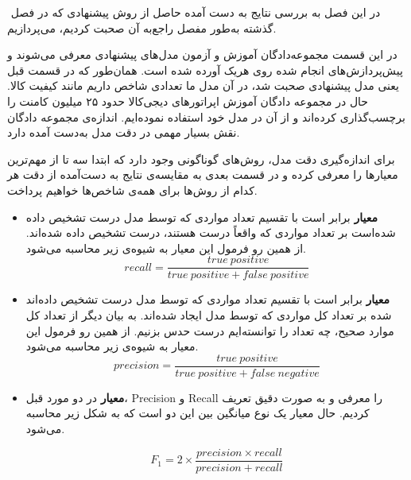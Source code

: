 
\label{sec:results}
‌
در این فصل به بررسی نتایج به دست آمده حاصل از روش پیشنهادی که در فصل گذشته به‌طور مفصل راجع‌به آن صحبت کردیم، می‌پردازیم.


در این قسمت مجموعه‌دادگان آموزش و آزمون مدل‌های پیشنهادی معرفی می‌شوند و پیش‌پردازش‌های انجام شده روی هریک آورده شده است.
همان‌طور که در قسمت قبل یعنی مدل پیشنهادی صحبت شد، در آن مدل ما تعدادی شاخص داریم مانند کیفیت کالا.  حال در مجموعه دادگان آموزش اپراتورهای دیجی‌کالا حدود ۲۵ میلیون کامنت را برچسب‌گذاری کرده‌اند و از آن در مدل خود استفاده نموده‌ایم. اندازه‌ی مجموعه دادگان نقش بسیار مهمی در دقت مدل به‌دست آمده دارد.

برای اندازه‌گیری دقت مدل، روش‌های گوناگونی وجود دارد که ابتدا سه تا از مهم‌ترین معیارها را معرفی کرده و در قسمت بعدی به مقایسه‌ی نتایج به دست‌آمده از دقت هر کدام از روش‌ها برای همه‌ی شاخص‌ها خواهیم پرداخت.

\begin{itemize}
    \item \textbf{معیار }
    برابر است با تقسیم تعداد مواردی که توسط مدل درست تشخیص داده شده‌است بر تعداد مواردی که واقعاً درست هستند، درست تشخیص داده شده‌اند.
    از همین رو فرمول این معیار به شیوه‌ی زیر محاسبه می‌شود.
        \begin{equation}
            recall = \dfrac{true \: positive}{true \: positive + false \: positive}
        \end{equation}
    \item \textbf{معیار }
    برابر است با تقسیم تعداد مواردی که توسط مدل درست تشخیص داده‌اند شده بر تعداد کل مواردی که توسط مدل ایجاد شده‌اند. به بیان دیگر از تعداد کل موارد صحیح، چه تعداد را توانسته‌ایم درست حدس بزنیم. از همین رو فرمول این معیار به شیوه‌ی زیر محاسبه می‌شود.
        \begin{equation}
            precision = \dfrac{true \: positive}{true \: positive + false \: negative}
        \end{equation}
    \item \textbf{معیار }
     در دو مورد قبل، Precision و Recall را معرفی و به صورت دقیق تعریف کردیم. حال معیار 
     یک نوع میانگین بین این دو است که به شکل زیر محاسبه می‌شود.
     
        \begin{equation}
            F_1 = 2 \times \dfrac{precision \times recall}{precision + recall}
        \end{equation}
\end{itemize}


